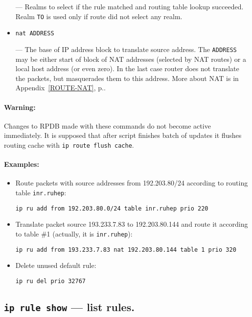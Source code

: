 \begin{itemize}
--- Realms to select if the rule matched and routing table lookup
succeeded. Realm \verb|TO| is used only if route did not select
any realm.

\item \verb|nat ADDRESS|

--- The base of IP address block to translate source address. 
The \verb|ADDRESS| may be either start of block of NAT addresses
(selected by NAT routes) or a local host address (or even zero).
In the last case router does not translate the packets, but masquerades them
to this address. More about NAT is in Appendix~\ref{ROUTE-NAT},
p.\pageref{ROUTE-NAT}.

\end{itemize}

\paragraph{Warning:} Changes to RPDB made with these commands
do not become active immediately. It is supposed that after
script finishes batch of updates it flushes routing cache
with \verb|ip route flush cache|.

\paragraph{Examples:}
\begin{itemize}
\item Route packets with source addresses from 192.203.80/24
according to routing table \verb|inr.ruhep|:
\begin{verbatim}
ip ru add from 192.203.80.0/24 table inr.ruhep prio 220
\end{verbatim}

\item Translate packet source 193.233.7.83 to 192.203.80.144
and route it according to table \#1 (actually, it is \verb|inr.ruhep|):
\begin{verbatim}
ip ru add from 193.233.7.83 nat 192.203.80.144 table 1 prio 320
\end{verbatim}

\item Delete unused default rule:
\begin{verbatim}
ip ru del prio 32767
\end{verbatim}

\end{itemize}



\subsection{{\tt ip rule show} --- list rules.}
\label{IP-RULE-SHOW}

